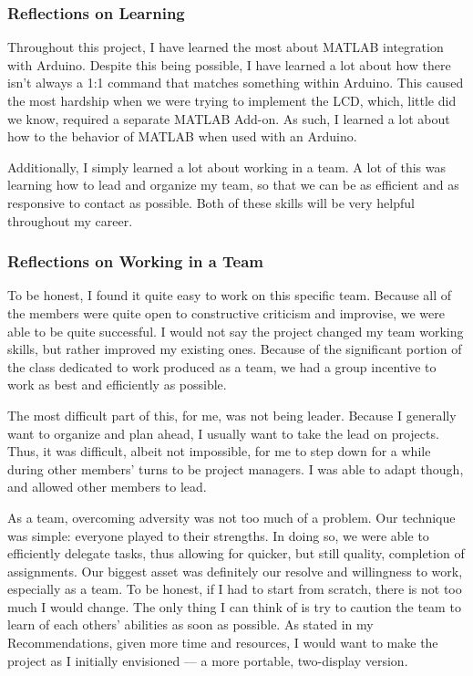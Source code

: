 \documentclass[conference]{IEEEtran}
\begin{document}
\subsubsection{Reflections on Learning}

\par Throughout this project, I have learned the most about MATLAB integration with Arduino. Despite this being possible, I have learned a lot about how there isn't always a 1:1 command that matches something within Arduino. This caused the most hardship when we were trying to implement the LCD, which, little did we know, required a separate MATLAB Add-on. As such, I learned a lot about how to the behavior of MATLAB when used with an Arduino. 
\par Additionally, I simply learned a lot about working in a team. A lot of this was learning how to lead and organize my team, so that we can be as efficient and as responsive to contact as possible. Both of these skills will be very helpful throughout my career.


\subsubsection{Reflections on Working in a Team}

\par To be honest, I found it quite easy to work on this specific team. Because all of the members were quite open to constructive criticism and improvise, we were able to be quite successful. I would not say the project changed my team working skills, but rather improved my existing ones. Because of the significant portion of the class dedicated to work produced as a team, we had a group incentive to work as best and efficiently as possible.
\par The most difficult part of this, for me, was not being leader. Because I generally want to organize and plan ahead, I usually want to take the lead on projects. Thus, it was difficult, albeit not impossible, for me to step down for a while during other members' turns to be project managers. I was able to adapt though, and allowed other members to lead.
\par As a team, overcoming adversity was not too much of a problem. Our technique was simple: everyone played to their strengths. In doing so, we were able to efficiently delegate tasks, thus allowing for quicker, but still quality, completion of assignments. Our biggest asset was definitely our resolve and willingness to work, especially as a team. To be honest, if I had to start from scratch, there is not too much I would change. The only thing I can think of is try to caution the team to learn of each others' abilities as soon as possible. As stated in my Recommendations, given more time and resources, I would want to make the project as I initially envisioned — a more portable, two-display version.
\end{document}
